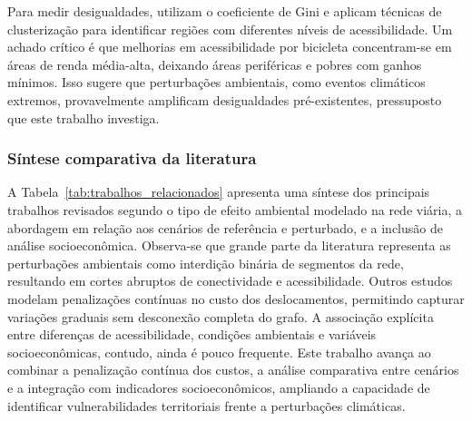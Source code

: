 Para medir desigualdades, \cite{PRITCHARD2019386} utilizam o 
coeficiente de Gini e aplicam técnicas de clusterização para identificar regiões com diferentes níveis de acessibilidade. Um achado crítico é que melhorias em acessibilidade por bicicleta 
concentram-se em áreas de renda média-alta, deixando áreas periféricas e 
pobres com ganhos mínimos. Isso sugere que perturbações ambientais, como 
eventos climáticos extremos, provavelmente amplificam desigualdades 
pré-existentes, pressuposto que este trabalho investiga.

\subsubsection{Síntese comparativa da literatura}


A Tabela~\ref{tab:trabalhos_relacionados} apresenta uma síntese dos principais trabalhos revisados segundo o tipo de efeito ambiental modelado na rede viária, a abordagem em relação aos cenários de referência e perturbado, e a inclusão de análise socioeconômica. Observa-se que grande parte da literatura representa as perturbações ambientais como interdição binária de segmentos da rede, resultando em cortes abruptos de conectividade e acessibilidade. Outros estudos modelam penalizações contínuas no custo dos deslocamentos, permitindo capturar variações graduais sem desconexão completa do grafo. A associação explícita entre diferenças de acessibilidade, condições ambientais e variáveis socioeconômicas, contudo, ainda é pouco frequente. Este trabalho avança ao combinar a penalização contínua dos custos, a análise comparativa entre cenários e a integração com indicadores socioeconômicos, ampliando a capacidade de identificar vulnerabilidades territoriais frente a perturbações climáticas.

